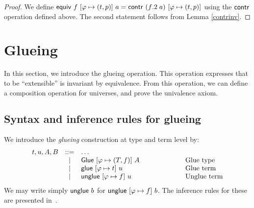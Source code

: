 \begin{proof}
  We define
  ${\sf equiv}~f{}~[\varphi \mapsto (t,p)]~a = {\sf contr}~(f{}.2 \;a)~[\varphi
  \mapsto (t,p)]$
  using the ${\sf contr}$ operation defined above. The second statement
  follows from Lemma \ref{contrinv}.
\end{proof}

\section{Glueing}\label{sec:glue}

In this section, we introduce the glueing operation. This operation
expresses that to be ``extensible'' is invariant by equivalence. From
this operation, we can define a composition operation for universes,
and prove the univalence axiom.

\subsection{Syntax and inference rules for glueing}\label{sec:glueing}

We introduce the \emph{glueing} construction at type and term level
by:
\[
\begin{array}{lcll}
  t,u,A,B       & ::= & \dots & \\
                & {~\mid~}  & {\sf Glue}~[\varphi\mapsto (T,f{})]~A & \hspace{2cm} \text{Glue type} \\
                & {~\mid~}  & {\sf glue}~[\varphi\mapsto t]~u & \hspace{2cm} \text{Glue term} \\
                & {~\mid~}  & {\sf unglue}~[\varphi\mapsto f{}]~u & \hspace{2cm} \text{Unglue term} \\
\end{array}
\]
We may write simply ${\sf unglue}~b$ for ${\sf unglue}~[\varphi\mapsto f{}]~b$.
The inference rules for these are presented in~.

